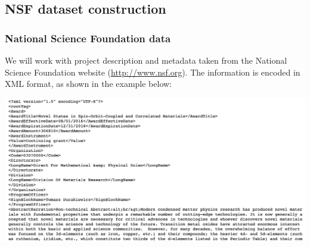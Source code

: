 \documentclass{beamer}
\begin{document}
\subsection{NSF dataset construction}


\begin{frame}

    \frametitle{National Science Foundation data}
    
	We will work with project description and metadata taken from the National Science Foundation website (\url{http://www.nsf.org}). The information is encoded in XML format, as shown in the example below:
	
	\vspace{.2cm}

	\centerline{\includegraphics[width=\textwidth]{./figs/NLPTM_xml.png}}

\end{frame}
\end{document}
